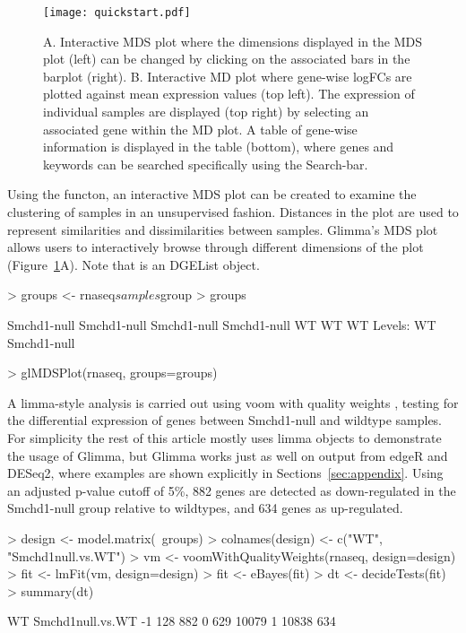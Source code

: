 \documentclass{article}
\newcommand{\Rfun}[1]{\textcolor{VioletRed}{{\sf{#1}}}}
\begin{document}
\begin{figure}[!ht]
  \centerline{\texttt{[image: quickstart.pdf]}}
  \caption{A. Interactive MDS plot where the dimensions displayed in the MDS plot (left) can be changed by clicking on the associated bars in the barplot (right). B. Interactive MD plot where gene-wise logFCs are plotted against mean expression values (top left). The expression of individual samples are displayed (top right) by selecting an associated gene within the MD plot. A table of gene-wise information is displayed in the table (bottom), where genes and keywords can be searched specifically using the Search-bar.}
  \label{fig:quickstart}
\end{figure}

Using the \Rfun{glMDSPlot} functon, an interactive MDS plot can be created to examine the clustering of samples in an unsupervised fashion. Distances in the plot are used to represent similarities and dissimilarities between samples. Glimma's MDS plot allows users to interactively browse through different dimensions of the plot (Figure~\ref{fig:quickstart}A). Note that {} is an {\sf DGEList} object.
\begin{Schunk}
\begin{Sinput}
> groups <- rnaseq$samples$group
> groups
\end{Sinput}
\begin{Soutput}
[1] Smchd1-null Smchd1-null Smchd1-null Smchd1-null WT          WT          WT         
Levels: WT Smchd1-null
\end{Soutput}
\begin{Sinput}
> glMDSPlot(rnaseq, groups=groups)
\end{Sinput}
\end{Schunk}

A limma-style analysis is carried out using voom with quality weights \cite{voom, voomqwts}, testing for the differential expression of genes between Smchd1-null and wildtype samples. For simplicity the rest of this article mostly uses limma objects to demonstrate the usage of Glimma, but Glimma works just as well on output from edgeR and DESeq2, where examples are shown explicitly in Sections~\ref{sec:appendix}. Using an adjusted p-value cutoff of 5\%, 882 genes are detected as down-regulated in the Smchd1-null group relative to wildtypes, and 634 genes as up-regulated.
\begin{Schunk}
\begin{Sinput}
> design <- model.matrix(~groups)
> colnames(design) <- c("WT", "Smchd1null.vs.WT")
> vm <- voomWithQualityWeights(rnaseq, design=design)
> fit <- lmFit(vm, design=design)
> fit <- eBayes(fit)
> dt <- decideTests(fit)
> summary(dt)
\end{Sinput}
\begin{Soutput}
      WT Smchd1null.vs.WT
-1   128              882
0    629            10079
1  10838              634
\end{Soutput}
\end{Schunk}
\end{document}

